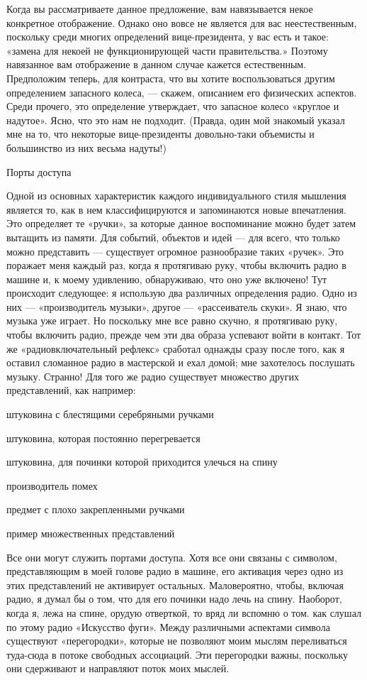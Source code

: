 \documentclass[../main.tex]{subfiles}
\begin{document}
Когда вы рассматриваете данное предложение, вам навязывается некое конкретное отображение. Однако оно вовсе не является для вас неестественным, поскольку среди многих определений вице-президента, у вас есть и такое: «замена для некоей не функционирующей части правительства.» Поэтому навязанное вам отображение в данном случае кажется естественным. Предположим теперь, для контраста, что вы хотите воспользоваться другим определением запасного колеса, --- скажем, описанием его физических аспектов. Среди прочего, это определение утверждает, что запасное колесо «круглое и надутое». Ясно, что это нам не подходит. (Правда, один мой знакомый указал мне на то, что некоторые вице-президенты довольно-таки объемисты и большинство из них весьма надуты!)

Порты доступа

Одной из основных характеристик каждого индивидуального стиля мышления является то, как в нем классифицируются и запоминаются новые впечатления. Это определяет те «ручки», за которые данное воспоминание можно будет затем вытащить из памяти. Для событий, объектов и идей --- для всего, что только можно представить --- существует огромное разнообразие таких «ручек». Это поражает меня каждый раз, когда я протягиваю руку, чтобы включить радио в машине и, к моему удивлению, обнаруживаю, что оно уже включено! Тут происходит следующее: я использую два различных определения радио. Одно из них --- «производитель музыки», другое --- «рассеиватель скуки». Я знаю, что музыка уже играет. Но поскольку мне все равно скучно, я протягиваю руку, чтобы включить радио, прежде чем эти два образа успевают войти в контакт. Тот же «радиовключательный рефлекс» сработал однажды сразу после того, как я оставил сломанное радио в мастерской и ехал домой; мне захотелось послушать музыку. Странно! Для того же радио существует множество других представлений, как например:

штуковина с блестящими серебряными ручками

штуковина, которая постоянно перегревается

штуковина, для починки которой приходится улечься на спину

производитель помех

предмет с плохо закрепленными ручками

пример множественных представлений

Все они могут служить портами доступа. Хотя все они связаны с символом, представляющим в моей голове радио в машине, его активация через одно из этих представлений не активирует остальных. Маловероятно, чтобы, включая радио, я думал бы о том, что для его починки надо лечь на спину. Наоборот, когда я, лежа на спине, орудую отверткой, то вряд ли вспомню о том. как слушал по этому радио «Искусство фуги». Между различными аспектами символа существуют «перегородки», которые не позволяют моим мыслям переливаться туда-сюда в потоке свободных ассоциаций. Эти перегородки важны, поскольку они сдерживают и направляют поток моих мыслей.
\end{document}
